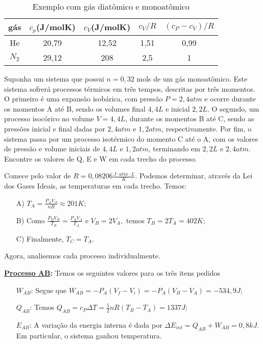 \documentclass[PhysicsII/phsyicsII_notes.tex]{subfiles}
\begin{document}
\begin{center}
	\begin{table}[h!]
		\caption{Exemplo com gás diatômico e monoatômico}
		\centering
		\begin{tabular}{| c | c | c | c | c |}
			\hline
			gás       & \(c_{p}\)(J/molK) & \(c_{V}\)(J/molK) & \(c_{V}/R\) & \((c_{P}-c_{V})/R\) \\
			\hline
			He        & 20,79             & 12,52             & 1,51        & 0,99                \\
			\(N_{2}\) & 29,12             & 208               & 2,5         & 1                   \\
			\hline
		\end{tabular}
	\end{table}
\end{center}
\begin{example}
	Suponha um sistema que possui \(n=0,32\) mols de um gás monoatômico. Este sistema sofrerá processos térmicos em três tempos,
	descritas por três momentos. O primeiro é uma expansão isobárica, com pressão \(P = 2,4atm\) e ocorre durante os momentos A até B, sendo os volumes final \(4,4L\) e inicial \(2,2L\). O segundo,
	um processo isocórico no volume \(V = 4,4L\), durante os momentos B até C, sendo as pressões inicial e final dadas por \(2,4atm\) e \(1,2atm\), respectivamente.
	Por fim, o sistema passa por um processo isotérmico do momento C até o A, com os valores de pressão e volume iniciais de \(4,4L\) e \(1,2atm\), terminando
	em \(2,2L\) e \(2,4atm\). Encontre os valores de Q, E e W em cada trecho do processo.

	Comece pelo valor de \(R = 0,08206 \frac{J \cdot atm \cdot L}{K}\). Podemos determinar, através da Lei dos Gases Ideais,
	as temperaturas em cada trecho. Temos:
	\begin{itemize}
		\item[A)] \(T_{A} = \frac{P_{A}V_{A}}{nR}\approx 201K\);
		\item[B)] Como \(\frac{P_{B}V_{B}}{T_{B}} = \frac{P_{A}V_{A}}{T_{A}}\) e \(V_{B} = 2V_{A},\) temos \(T_{B} = 2T_{A} = 402K;\)
		\item[C)] Finalmente, \(T_{C} = T_{A}.\)
	\end{itemize}
	Agora, analisemos cada processo individualmente.

	\textbf{\underline{Processo AB}:} Temos os seguintes valores para os três itens pedidos
	\begin{itemize}
		\item[\(W_{AB}\):] Segue que \(W_{AB} = -P_{A}(V_{f}-V_{i}) = -P_{A}(V_{B}-V_{A}) = -534,9J\);
		\item[\(Q_{AB}\):] Temos \(Q_{AB} = c_{P}\Delta T = \frac{5}{2}nR(T_{B}-T_{A}) = 1337J\);
		\item[\(E_{AB}\):] A variação da energia interna é dada por \(\Delta E_{int} = Q_{AB} + W_{AB} = 0,8kJ.\) Em particular,
		      o sistema ganhou temperatura.
	\end{itemize}


\end{example}
\end{document}
